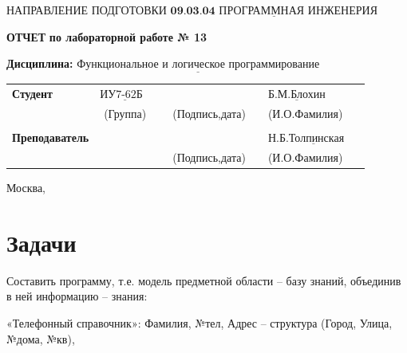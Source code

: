 \documentclass[12pt,a4paper,oneside]{report}
\begin{document}
\noindent НАПРАВЛЕНИЕ ПОДГОТОВКИ $\underline{\textbf{09.03.04 ПРОГРАММНАЯ ИНЖЕНЕРИЯ}}$\newline\newline\newline\newline\newline\newline\newline
\begin{center}
    \begin{flushright}
    \Large\textbf{ОТЧЕТ}\newline
	\Large\textbf{по лабораторной работе № 13}\newline
	\end{flushright}
\end{center}
\noindent\textbf{Дисциплина:} $\underline{\text{Функциональное и логическое программирование}}$\newline\newline\newline\newline\newline\newline\newline\newline
\begin{tabular}{lcp{5em}lp{2em}l}
	\noindent\textbf{Студент} &  $\underline{\text{ИУ7-62Б~~}}$ &             &\hspace{1cm} & & $\underline{\text{Б.М.Блохин}}$ \\\cline{4-3}
	 & (Группа) & &(Подпись,дата)  & & (И.О.Фамилия) \\
	 & & & & &\\
	\noindent\textbf{Преподаватель} &  & &\hspace{1cm} & &$\underline{\text{Н.Б.Толпинская~~~~}}$ \\\cline{4-3} 
	 &  & & (Подпись,дата)  & &(И.О.Фамилия) \\
    \end{tabular}
\begin{center}
	\vfill
	Москва,\the\year
\end{center}
\newpage


\chapter*{Задачи}
\quad Составить программу, т.е. модель предметной области – базу знаний, объединив в ней информацию – знания:

«Телефонный справочник»: Фамилия, №тел, Адрес – структура (Город, Улица, №дома, №кв),
\end{document}

